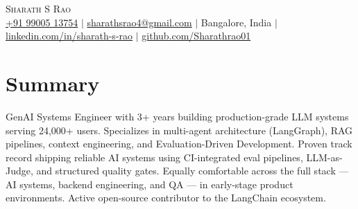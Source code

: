 \documentclass[letterpaper,11pt]{article}
\begin{document}
\begin{center}
    {\Huge \scshape Sharath S Rao} \\ \vspace{4pt}
    \small
    \href{tel:+919900513754}{+91 99005 13754} $|$
    \href{mailto:sharathsrao4@gmail.com}{sharathsrao4@gmail.com} $|$
    Bangalore, India $|$
    \href{https://linkedin.com/in/sharath-s-rao}{linkedin.com/in/sharath-s-rao} $|$
    \href{https://github.com/Sharathrao01}{github.com/Sharathrao01}
\end{center}

\section{Summary}
\begin{itemize}[leftmargin=0.15in, label={}]
  \small{\item{
    GenAI Systems Engineer with 3+ years building production-grade LLM systems serving 24,000+ users.
    Specializes in multi-agent architecture (LangGraph), RAG pipelines, context engineering, and
    Evaluation-Driven Development. Proven track record shipping reliable AI systems using CI-integrated
    eval pipelines, LLM-as-Judge, and structured quality gates. Equally comfortable across the full
    stack --- AI systems, backend engineering, and QA --- in early-stage product environments.
    Active open-source contributor to the LangChain ecosystem.
  }}
\end{itemize}
\vspace{-8pt}

\end{document}
